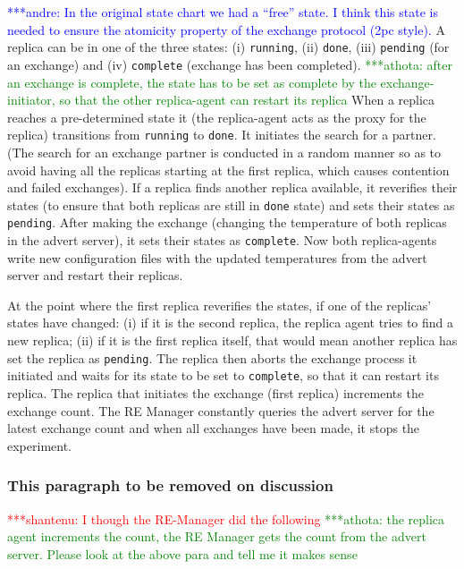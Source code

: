 \documentclass{rspublic}
\newcommand{\jhanote}[1]{ {\textcolor{red} { ***shantenu: #1 }}}
\newcommand{\alnote}[1]{ {\textcolor{blue} { ***andre: #1 }}}
\newcommand{\athotanote}[1]{ {\textcolor{green} { ***athota: #1 }}}
\newcommand{\alnote}[1]{}
\newcommand{\athotanote}[1]{}
\newcommand{\jhanote}[1]{}
\begin{document}
\alnote{In the original state chart we had a ``free'' state. I think this state
is needed to ensure the atomicity property of the exchange protocol (2pc style).}
A replica can be in one of the three states: (i) \texttt{running},
(ii) \texttt{done}, (iii) \texttt{pending} (for an exchange) and (iv) \texttt{complete} (exchange has been completed).\athotanote{after an exchange is complete, the state has to be set as complete by the exchange-initiator, so that the other replica-agent can restart its replica}    When
a replica reaches a pre-determined state it (the replica-agent acts as
the proxy for the replica) transitions from \texttt{running} to
\texttt{done}. It initiates the search for a partner.  (The search
for an exchange partner is conducted in a random manner so as to avoid
having all the replicas starting at the first replica, which causes
contention and failed exchanges).  If a replica finds another replica
available, it reverifies their states (to ensure that both replicas are still in \texttt{done} state) and sets their states as \texttt{pending}. After making the exchange (changing the temperature of both replicas in the advert server), it sets their states as \texttt{complete}. Now both replica-agents write new configuration files with the updated temperatures from the advert server and restart their replicas. 

At the point where the first replica reverifies the states, if one of the replicas' states have changed: (i) if it is the second replica, the replica agent tries to find a new replica; (ii) if it is the first replica itself, that would mean another replica has set the replica as \texttt{pending}. The replica then aborts the exchange process it initiated and waits for its state to be set to \texttt{complete}, so that it can restart its replica. The replica that initiates the exchange (first replica) increments the exchange count. The RE Manager constantly queries the advert server for the latest exchange count and when all exchanges have been made, it stops the experiment. 

\subsubsection*{This paragraph to be removed on discussion}


\jhanote{I though the RE-Manager did the following} \athotanote{the replica agent increments the count, the RE Manager gets the count from the advert server. Please look at the above para and tell me it makes sense}
\end{document}
